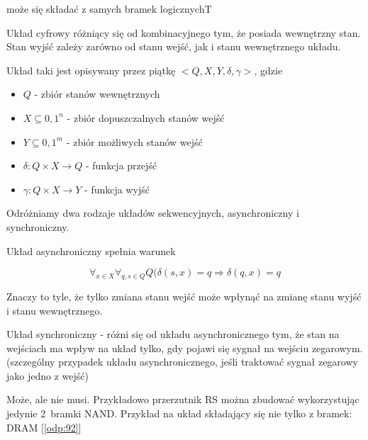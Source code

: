 {może się składać z samych bramek logicznych}{T}
{
Układ cyfrowy różniący się od kombinacyjnego tym, że posiada wewnętrzny stan. Stan wyjść zależy zarówno od stanu wejść, jak i stanu wewnętrznego układu.

Układ taki jest opisywany przez piątkę $<Q, X, Y, \delta, \gamma>$, gdzie

\begin{itemize}
\item $Q$ - zbiór stanów wewnętrznych
\item $X \subseteq {0,1}^n$ - zbiór dopuszczalnych stanów wejść
\item $Y \subseteq {0,1}^m$ - zbiór możliwych stanów wejść
\item $\delta:Q\times X\rightarrow Q$ - funkcja przejść
\item $\gamma:Q\times X\rightarrow Y$ - funkcja wyjść
\end{itemize}

Odróżniamy dwa rodzaje układów sekwencyjnych, asynchroniczny i synchroniczny.

Układ asynchroniczny spełnia warunek

\begin{equation}
\label{sekasy}
\forall_{x\in X}\forall_{q,s\in Q}Q(\delta(s,x)=q\Rightarrow\delta(q,x)=q
\end{equation}

Znaczy to tyle, że tylko zmiana stanu wejść może wpłynąć na zmianę stanu wyjść i stanu wewnętrznego.

Układ synchroniczny - różni się od układu asynchronicznego tym, że stan na wejściach ma wpływ na układ tylko, gdy pojawi się sygnał na wejściu zegarowym. (szczególny przypadek układu asynchronicznego, jeśli traktować sygnał zegarowy jako jedno z wejść)

}
{Może, ale nie musi. Przykładowo przerzutnik RS można zbudować wykorzystując jedynie 2~bramki NAND. Przykład na układ składający się nie tylko z bramek: DRAM [\ref{odp:92}]}
\label{odp:91}

